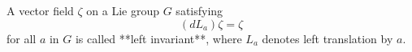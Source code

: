 A vector field $\zeta$ on a Lie group $G$ satisfying
$$
(dL_a)\zeta = \zeta
$$
for all $a$ in $G$ is called **left invariant**, where $L_a$ denotes left translation by $a$.
